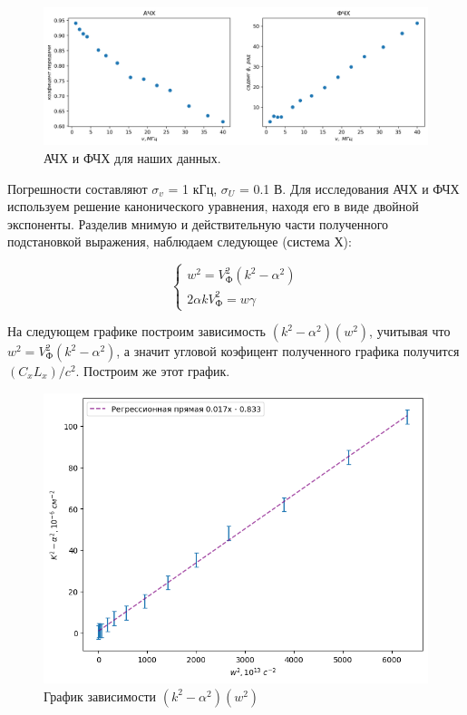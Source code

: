 \documentclass[a4paper,12pt]{article} %
\begin{document}
\begin{figure}[H]
    \centering
    \includegraphics[width=1\linewidth]{plot/fig8.png}
    \caption{АЧХ и ФЧХ для наших данных.}
\end{figure}

Погрешности составляют $\sigma_v$ = 1 кГц,  $\sigma_U$ = 0.1 В. Для исследования АЧХ и ФЧХ используем решение канонического уравнения, находя его в виде двойной экспоненты. Разделив мнимую и действительную части полученного подстановкой выражения, наблюдаем следующее (система Х):

\begin{equation}
\begin{cases}
    w^2 = V_\text{Ф}^2 (k^2 - \alpha ^2) \\
    2\alpha kV_\text{Ф}^2 = w\gamma
\end{cases}
\end{equation}

На следующем графике построим зависимость $(k^2 - \alpha ^2)(w^2)$, учитывая что $w^2 = V_\text{Ф}^2 (k^2 - \alpha ^2)$, а значит угловой коэфицент полученного графика получится $(C_xL_x)/c^2$. Построим же этот график. 

\begin{figure}[H]
    \centering
    \includegraphics[width=0.7\linewidth]{plot/fig3.png}
    \caption{График зависимости $(k^2 - \alpha ^2)(w^2)$}
\end{figure}
\end{document}
